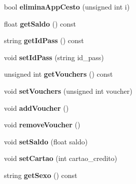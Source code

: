 \begin{DoxyCompactItemize}
\item 
\hypertarget{class_cliente_a9e8ccf7381214170da3c8c1e5b0bfde1}{bool {\bfseries elimina\+App\+Cesto} (unsigned int i)}\label{class_cliente_a9e8ccf7381214170da3c8c1e5b0bfde1}

\item 
\hypertarget{class_cliente_ac91943541afd55e1b8e7d3139197b3b0}{float {\bfseries get\+Saldo} () const }\label{class_cliente_ac91943541afd55e1b8e7d3139197b3b0}

\item 
\hypertarget{class_cliente_aa43047aa16c5f72c46a082dfb990074f}{string {\bfseries get\+Id\+Pass} () const }\label{class_cliente_aa43047aa16c5f72c46a082dfb990074f}

\item 
\hypertarget{class_cliente_a646583af1403099173848eda00f99ce7}{void {\bfseries set\+Id\+Pass} (string id\+\_\+pass)}\label{class_cliente_a646583af1403099173848eda00f99ce7}

\item 
\hypertarget{class_cliente_a1984ef662ce9ae14dbf654c0a6b8fb09}{unsigned int {\bfseries get\+Vouchers} () const }\label{class_cliente_a1984ef662ce9ae14dbf654c0a6b8fb09}

\item 
\hypertarget{class_cliente_aeb1b9cce72b0d01ce9bf1771a6b95c2d}{void {\bfseries set\+Vouchers} (unsigned int voucher)}\label{class_cliente_aeb1b9cce72b0d01ce9bf1771a6b95c2d}

\item 
\hypertarget{class_cliente_a0779a68f66b79b31e6dd8e5a25128f18}{void {\bfseries add\+Voucher} ()}\label{class_cliente_a0779a68f66b79b31e6dd8e5a25128f18}

\item 
\hypertarget{class_cliente_a73277ee6744a63e34233823634ec47df}{void {\bfseries remove\+Voucher} ()}\label{class_cliente_a73277ee6744a63e34233823634ec47df}

\item 
\hypertarget{class_cliente_a78fe91598a0632e05d09c9341c4b0716}{void {\bfseries set\+Saldo} (float saldo)}\label{class_cliente_a78fe91598a0632e05d09c9341c4b0716}

\item 
\hypertarget{class_cliente_a90e6e08c252e4eee99858af9f9b4eb99}{void {\bfseries set\+Cartao} (int cartao\+\_\+credito)}\label{class_cliente_a90e6e08c252e4eee99858af9f9b4eb99}

\item 
\hypertarget{class_cliente_a5e51d7c8aef74564f7e9770cd12b7fcf}{string {\bfseries get\+Sexo} () const }\label{class_cliente_a5e51d7c8aef74564f7e9770cd12b7fcf}


\end{DoxyCompactItemize}

